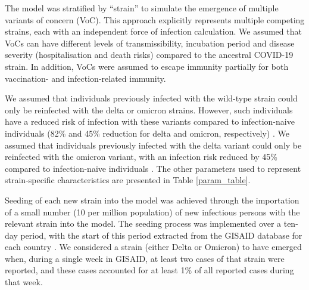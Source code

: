 
The model was stratified by ``strain'' to simulate the emergence of multiple variants of concern (VoC).
This approach explicitly represents multiple competing strains, each with an independent force of infection calculation.
We assumed that VoCs can have different levels of transmissibility, incubation period and disease severity 
(hospitalisation and death risks) compared to the ancestral COVID-19 strain. In addition, VoCs were assumed to escape 
immunity partially for both vaccination- and infection-related immunity. 

We assumed that individuals previously infected with the wild-type strain could only be reinfected with the delta or 
omicron strains. However, such individuals have a reduced risk of infection with these variants compared to 
infection-naive individuals (82\% and 45\% reduction for delta and omicron, respectively) \cite{stein2023}.
We assumed that individuals previously infected with the delta variant could only be reinfected with the omicron variant, 
with an infection risk reduced by 45\% compared to infection-naive individuals \cite{stein2023}. 
The other parameters used to represent strain-specific characteristics are presented in Table \ref{param_table}.

Seeding of each new strain into the model was achieved through the importation of a small number (10 per million population) of new infectious persons with the relevant strain into the model.
The seeding process was implemented over a ten-day period, with the start of this period extracted from the GISAID database for each country \cite{gisaid2023}. 
We considered a strain (either Delta or Omicron) to have emerged when, during a single week in GISAID, at least two cases of that strain were reported, and these cases accounted for at least 1\% of all reported cases during that week.
